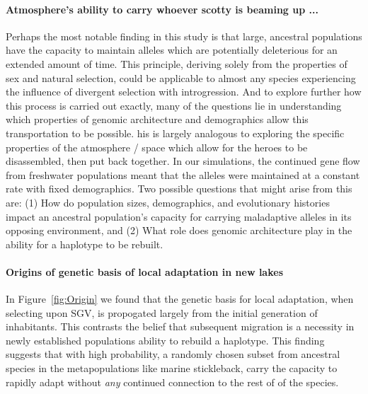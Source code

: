 \documentclass{article}
\begin{document}
 \paragraph{Atmosphere's ability to carry whoever scotty is beaming up ... }
Perhaps the most notable finding in this study is that large, ancestral populations have the capacity to maintain alleles which are potentially deleterious for an extended amount of time.  
This principle, deriving solely from the properties of sex and natural selection, could be applicable to almost any species experiencing the influence of divergent selection with introgression.
And to explore further how this process is carried out exactly, many of the questions lie in understanding which properties of genomic architecture and demographics allow this transportation to be possible. 
his is largely analogous to exploring the specific properties of the atmosphere / space which allow for the heroes to be disassembled, then put back together.
In our simulations, the continued gene flow from freshwater populations meant that the alleles were maintained at a constant rate with fixed demographics. 
Two possible questions that might arise from this are:
(1) How do population sizes, demographics, and evolutionary histories impact an ancestral population's capacity for carrying maladaptive alleles in its opposing environment, and 
(2) What role does genomic architecture play in the ability for a haplotype to be rebuilt.
 
\paragraph{Origins of genetic basis of local adaptation in new lakes}
In Figure~\ref{fig:Origin} we found that the genetic basis for local adaptation, when selecting upon SGV, is propogated largely from the initial generation of inhabitants. 
This contrasts the belief that subsequent migration is a necessity in newly established populations ability to rebuild a haplotype.
This finding suggests that with high probability, a randomly chosen subset from ancestral species in the metapopulations like marine stickleback, 
carry the capacity to rapidly adapt without \emph{any} continued connection to the rest of of the species.
\end{document}

